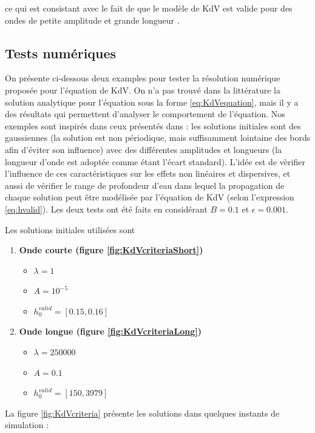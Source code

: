 \noindent ce qui est consistant avec le fait de que le modèle de KdV est valide pour des ondes de petite amplitude et grande longueur \cite{BBM1971}.

\subsection{Tests numériques}

\indent On présente ci-dessous deux examples pour tester la résolution numérique proposée pour l'équation de KdV. On n'a pas trouvé dans la littérature la solution analytique pour l'équation sous la forme \eqref{eq:KdVequation}, mais il y a des résultats qui permettent d'analyser le comportement de l'équation. Nos exemples sont inspirés dans ceux présentés dans \cite{conservationLaws2002}: les solutions initiales sont des gaussiennes (la solution est non périodique, mais suffisamment lointaine des bords afin d'éviter son influence) avec des différentes amplitudes et longueurs (la longueur d'onde est adoptée comme étant l'écart standard). L'idée est de vèrifier l'influence de ces caractéristiques sur les effets non linéaires et dispersives, et aussi de vérifier le range de profondeur d'eau dans lequel la propagation de chaque solution peut être modélisée par l'équation de KdV (selon l'expression \ref{eq:hvalid}). Les deux tests ont été faits en considérant $B = 0.1$ et $\epsilon = 0.001$.

\indent Les solutions initiales utilisées sont

\begin{enumerate}
	\item \textbf{Onde courte (figure \ref{fig:KdVcriteriaShort})} %
		\begin{itemize}
			\item $\lambda = 1$
			\item $ A = 10^{-5}$
			\item $ h_0^{valid} = [0.15, 0.16] $
		\end{itemize}
	\item \textbf{Onde longue (figure \ref{fig:KdVcriteriaLong})} %
		\begin{itemize}
			\item $\lambda = 250000$
			\item $ A = 0.1$
			\item $ h_0^{valid} = [150, 3979] $
		\end{itemize}
\end{enumerate}

\indent La figure \ref{fig:KdVcriteria} présente les solutions dans quelques instants de simulation :


